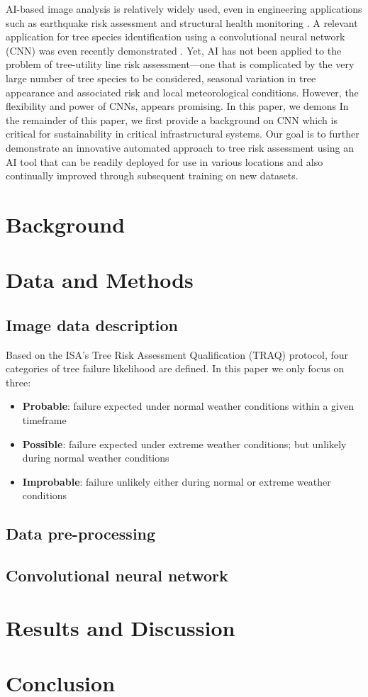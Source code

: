 \documentclass[11pt,twoside]{article}
\numberwithin{equation}{section}
\newcommand{\?}{\stackrel{?}{=}}
\begin{document}
AI-based image analysis is relatively widely used, even in engineering applications such as earthquake risk assessment
\cite{jiao2020artificial,salehi2018emerging} and structural health monitoring \cite{spencer2019advances}. A relevant
application for tree species identification using a convolutional neural network (CNN) was even recently demonstrated
\cite{fricker2019convolutional}. Yet, AI has not been applied to the problem of tree-utility line risk assessment---one that is
complicated by the very large number of tree species to be considered, seasonal variation in tree appearance and
associated risk and local meteorological conditions. However, the flexibility and power of CNNs, appears promising. In
this paper, we demons In the remainder of this paper, we first provide a background on CNN which is critical for
sustainability in critical infrastructural systems. Our goal is to further demonstrate an innovative automated approach
to tree risk assessment using an AI tool that can be readily deployed for use in various locations and also continually
improved through subsequent training on new datasets.

\section{Background}

 


\section{Data and Methods}
\subsection{Image data description}
Based on the  ISA’s Tree Risk Assessment Qualification (TRAQ) protocol, four categories of tree failure likelihood are defined. In this paper we only focus on three:
\begin{itemize}
\item \textbf{Probable}: failure expected under normal weather conditions within a given timeframe
\item \textbf{Possible}: failure expected under extreme weather conditions; but unlikely during normal weather conditions
\item \textbf{Improbable}: failure unlikely either during normal or extreme weather conditions 
\end{itemize}

\subsection{Data pre-processing}

\subsection{Convolutional neural network}

\section{Results and Discussion}


\section{Conclusion}

\printbibliography

\appendix
\end{document}

